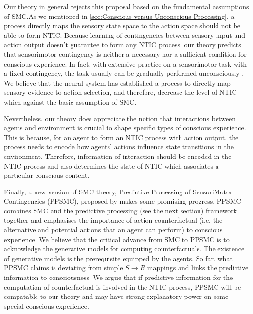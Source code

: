 \documentclass[utf8]{article}
\begin{document}
	    Our theory in general rejects this proposal based on the fundamental assumptions of SMC.As we mentioned in \ref{sec:Conscious versus Unconscious Processing}, a process directly maps the sensory state space to the action space should not be able to form NTIC. Because learning of contingencies between sensory input and action output doesn't guarantee to form any NTIC process, our theory predicts that sensorimotor contingency is neither a necessary nor a sufficient condition for conscious experience. In fact, with extensive practice on a sensorimotor task with a fixed contingency, the task usually can be gradually performed unconsciously \needref{}. We believe that the neural system has established a process to directly map sensory evidence to action selection, and therefore, decrease the level of NTIC which against the basic assumption of SMC.
	    
	    Nevertheless, our theory does appreciate the notion that interactions between agents and environment is crucial to shape specific types of conscious experience. This is because, for an agent to form an NTIC process with action output, the process needs to encode how agents' actions influence state transitions in the environment. Therefore, information of interaction should be encoded in the NTIC process and also determines the state of NTIC which associates a particular conscious content. 
	    
        Finally, a new version of SMC theory, Predictive Processing of SensoriMotor Contingencies (PPSMC), proposed by \cite{seth2014predictive, seth2015presence} makes some promising progress. PPSMC combines SMC and the predictive processing (see the next section) framework together and emphasises the importance of action counterfactual (i.e. the alternative and potential actions that an agent can perform) to conscious experience. We believe that the critical advance from SMC to PPSMC is to acknowledge the generative models for computing counterfactuals. The existence of generative models is the prerequisite equipped by the agents. So far, what PPSMC claims is deviating from simple $S\rightarrow{}R$ mappings and links the predictive information to consciousness. We argue that if predictive information for the computation of counterfactual is involved in the NTIC process, PPSMC will be compatable to our theory and may have strong explanatory power on some special conscious experience. 


\end{document}
